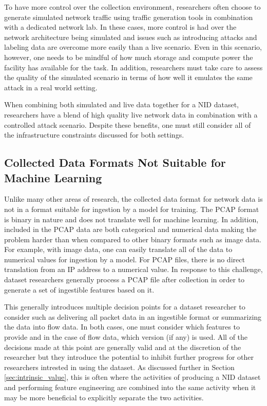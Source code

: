 \documentclass[conference]{IEEEtran}
\begin{document}
To have more control over the collection environment, researchers often choose to generate simulated network traffic using traffic generation tools in combination with a dedicated network lab.
In these cases, more control is had over the network architecture being simulated and issues such as introducing attacks and labeling data are overcome more easily than a live scenario.
Even in this scenario, however, one needs to be mindful of how much storage and compute power the facility has available for the task.
In addition, researchers must take care to assess the quality of the simulated scenario in terms of how well it emulates the same attack in a real world setting.

When combining both simulated and live data together for a NID dataset, researchers have a blend of high quality live network data in combination with a controlled attack scenario.
Despite these benefits, one must still  consider all of the infrastructure constraints discussed for both settings.

\subsection{Collected Data Formats Not Suitable for Machine Learning}\label{subsec:collectionformat}
Unlike many other areas of research, the collected data format for network data is not in a format suitable for ingestion by a model for training.
The PCAP format is binary in nature and does not translate well for machine learning.
In addition, included in the PCAP data are both categorical and numerical data making the problem harder than when compared to other binary formats such as image data. 
For example, with image data, one can easily translate all of the data to numerical values for ingestion by a model.
For PCAP files, there is no direct translation from an IP address to a numerical value.
In response to this challenge, dataset researchers generally process a PCAP file after collection in order to generate a set of ingestible features based on it.

This generally introduces multiple decision points for a dataset researcher to consider such as delivering all packet data in an ingestible format or summarizing the data into flow data. 
In both cases, one must consider which features to provide and in the case of flow data, which version (if any) is used.
All of the decisions made at this point are generally valid and at the discretion of the researcher but they introduce the potential to inhibit further progress for other researchers intrested in using the dataset.
As discussed further in Section \ref{sec:intrinsic_value}, this is often where the activities of producing a NID dataset and performing feature engineering are combined into the same activity when it may be more beneficial to explicitly separate the two activities.
\end{document}

